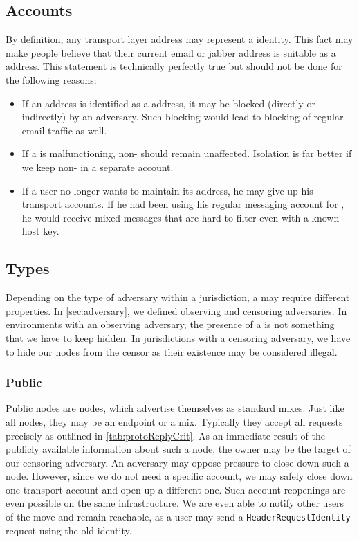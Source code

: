 \subsection{\MessageVortex{} Accounts}
By definition, any transport layer address may represent a \MessageVortex{} identity. This fact may make people believe that their current email or jabber address is suitable as a \MessageVortex address. This statement is technically perfectly true but should not be done for the following reasons:
\begin{itemize}
	\item If an address is identified as a \MessageVortex{} address, it may be blocked (directly or indirectly) by an adversary. Such blocking would lead to blocking of regular email traffic as well.
	\item If a \VortexNode{} is malfunctioning, non-\VortexMessages{} should remain unaffected. Isolation is far better if we keep non-\VortexMessages{} in a separate account.
	\item If a user no longer wants to maintain its \MessageVortex{} address, he may give up his \MessageVortex transport accounts. If he had been using his regular messaging account for \MessageVortex, he would receive mixed messages that are hard to filter even with a known host key.
\end{itemize}

\subsection{\VortexNode{} Types}\label{sec:vortexNodeTypes}
Depending on the type of adversary within a jurisdiction, a \VortexNode{} may require different properties. In \cref{sec:adversary}, we defined observing and censoring adversaries. In environments with an observing adversary, the presence of a \VortexNode{} is not something that we have to keep hidden. In jurisdictions with a censoring adversary, we have to hide our nodes from the censor as their existence may be considered illegal.

\subsubsection{Public \VortexNode}
Public nodes are nodes, which advertise themselves as standard mixes. Just like all nodes, they may be an endpoint or a mix. Typically they accept all requests precisely as outlined in \cref{tab:protoReplyCrit}. As an immediate result of the publicly available information about such a node, the owner may be the target of our censoring adversary. An adversary may oppose pressure to close down such a node. However, since we do not need a specific account, we may safely close down one transport account and open up a different one. Such account reopenings are even possible on the same infrastructure. We are even able to notify other users of the move and remain reachable, as a user may send a \texttt{HeaderRequestIdentity} request using the old identity. 

